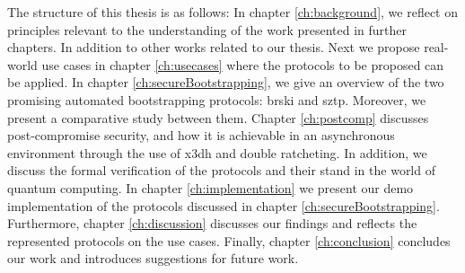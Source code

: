 The structure of this thesis is as follows: In chapter \ref{ch:background}, we reflect on principles relevant to the understanding of the work presented in further chapters. In addition to other works related to our thesis. 
Next we propose real-world use cases in chapter \ref{ch:usecases} where the protocols to be proposed can be applied.
In chapter \ref{ch:secureBootstrapping}, we give an overview of the two promising automated bootstrapping protocols: \gls{brski} and \gls{sztp}. Moreover, we present a comparative study between them.
Chapter \ref{ch:postcomp} discusses post-compromise security, and how it is achievable in an asynchronous environment through the use of \gls{x3dh} and double ratcheting. In addition, we discuss the formal verification of the protocols and their stand in the world of quantum computing.
In chapter \ref{ch:implementation} we present our demo implementation of the protocols discussed in chapter \ref{ch:secureBootstrapping}. 
Furthermore, chapter \ref{ch:discussion} discusses our findings and reflects the represented protocols on the use cases.
Finally, chapter \ref{ch:conclusion} concludes our work and introduces suggestions for future work.